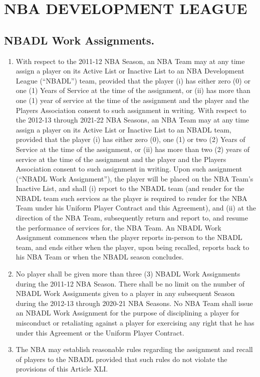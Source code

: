 \documentclass[
]{book}
\providecommand{\tightlist}{%
  \setlength{\itemsep}{0pt}\setlength{\parskip}{0pt}}
\begin{document}
\hypertarget{nba-development-league}{%
\chapter{NBA DEVELOPMENT LEAGUE}\label{nba-development-league}}

\hypertarget{nbadl-work-assignments.}{%
\section{NBADL Work Assignments.}\label{nbadl-work-assignments.}}

\begin{enumerate}
\def\labelenumi{(\alph{enumi})}
\tightlist
\item
  With respect to the 2011-12 NBA Season, an NBA Team may at any time assign a player on its Active List or Inactive List to an NBA Development League (``NBADL'') team, provided that the player (i) has either zero (0) or one (1) Years of Service at the time of the assignment, or (ii) has more than one (1) year of service at the time of the assignment and the player and the Players Association consent to such assignment in writing. With respect to the 2012-13 through 2021-22 NBA Seasons, an NBA Team may at any time assign a player on its Active List or Inactive List to an NBADL team, provided that the player (i) has either zero (0), one (1) or two (2) Years of Service at the time of the assignment, or (ii) has more than two (2) years of service at the time of the assignment and the player and the Players Association consent to such assignment in writing. Upon such assignment (``NBADL Work Assignment''), the player will be placed on the NBA Team's Inactive List, and shall (i) report to the NBADL team (and render for the NBADL team such services as the player is required to render for the NBA Team under his Uniform Player Contract and this Agreement), and (ii) at the direction of the NBA Team, subsequently return and report to, and resume the performance of services for, the NBA Team. An NBADL Work Assignment commences when the player reports in-person to the NBADL team, and ends either when the player, upon being recalled, reports back to his NBA Team or when the NBADL season concludes.
\item
  No player shall be given more than three (3) NBADL Work Assignments during the 2011-12 NBA Season. There shall be no limit on the number of NBADL Work Assignments given to a player in any subsequent Season during the 2012-13 through 2020-21 NBA Seasons. No NBA Team shall issue an NBADL Work Assignment for the purpose of disciplining a player for misconduct or retaliating against a player for exercising any right that he has under this Agreement or the Uniform Player Contract.
\item
  The NBA may establish reasonable rules regarding the assignment and recall of players to the NBADL provided that such rules do not violate the provisions of this Article XLI.
\end{enumerate}
\end{document}
